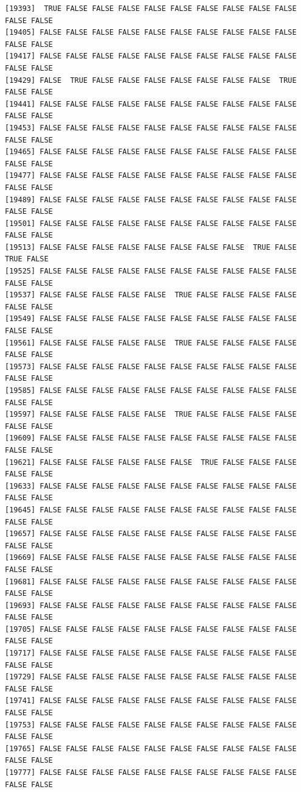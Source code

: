 \documentclass[
  a4paper,
  DIV=11,
  numbers=noendperiod]{scrartcl}
\begin{document}
\begin{verbatim}
[19393]  TRUE FALSE FALSE FALSE FALSE FALSE FALSE FALSE FALSE FALSE FALSE FALSE
[19405] FALSE FALSE FALSE FALSE FALSE FALSE FALSE FALSE FALSE FALSE FALSE FALSE
[19417] FALSE FALSE FALSE FALSE FALSE FALSE FALSE FALSE FALSE FALSE FALSE FALSE
[19429] FALSE  TRUE FALSE FALSE FALSE FALSE FALSE FALSE FALSE  TRUE FALSE FALSE
[19441] FALSE FALSE FALSE FALSE FALSE FALSE FALSE FALSE FALSE FALSE FALSE FALSE
[19453] FALSE FALSE FALSE FALSE FALSE FALSE FALSE FALSE FALSE FALSE FALSE FALSE
[19465] FALSE FALSE FALSE FALSE FALSE FALSE FALSE FALSE FALSE FALSE FALSE FALSE
[19477] FALSE FALSE FALSE FALSE FALSE FALSE FALSE FALSE FALSE FALSE FALSE FALSE
[19489] FALSE FALSE FALSE FALSE FALSE FALSE FALSE FALSE FALSE FALSE FALSE FALSE
[19501] FALSE FALSE FALSE FALSE FALSE FALSE FALSE FALSE FALSE FALSE FALSE FALSE
[19513] FALSE FALSE FALSE FALSE FALSE FALSE FALSE FALSE  TRUE FALSE  TRUE FALSE
[19525] FALSE FALSE FALSE FALSE FALSE FALSE FALSE FALSE FALSE FALSE FALSE FALSE
[19537] FALSE FALSE FALSE FALSE FALSE  TRUE FALSE FALSE FALSE FALSE FALSE FALSE
[19549] FALSE FALSE FALSE FALSE FALSE FALSE FALSE FALSE FALSE FALSE FALSE FALSE
[19561] FALSE FALSE FALSE FALSE FALSE  TRUE FALSE FALSE FALSE FALSE FALSE FALSE
[19573] FALSE FALSE FALSE FALSE FALSE FALSE FALSE FALSE FALSE FALSE FALSE FALSE
[19585] FALSE FALSE FALSE FALSE FALSE FALSE FALSE FALSE FALSE FALSE FALSE FALSE
[19597] FALSE FALSE FALSE FALSE FALSE  TRUE FALSE FALSE FALSE FALSE FALSE FALSE
[19609] FALSE FALSE FALSE FALSE FALSE FALSE FALSE FALSE FALSE FALSE FALSE FALSE
[19621] FALSE FALSE FALSE FALSE FALSE FALSE  TRUE FALSE FALSE FALSE FALSE FALSE
[19633] FALSE FALSE FALSE FALSE FALSE FALSE FALSE FALSE FALSE FALSE FALSE FALSE
[19645] FALSE FALSE FALSE FALSE FALSE FALSE FALSE FALSE FALSE FALSE FALSE FALSE
[19657] FALSE FALSE FALSE FALSE FALSE FALSE FALSE FALSE FALSE FALSE FALSE FALSE
[19669] FALSE FALSE FALSE FALSE FALSE FALSE FALSE FALSE FALSE FALSE FALSE FALSE
[19681] FALSE FALSE FALSE FALSE FALSE FALSE FALSE FALSE FALSE FALSE FALSE FALSE
[19693] FALSE FALSE FALSE FALSE FALSE FALSE FALSE FALSE FALSE FALSE FALSE FALSE
[19705] FALSE FALSE FALSE FALSE FALSE FALSE FALSE FALSE FALSE FALSE FALSE FALSE
[19717] FALSE FALSE FALSE FALSE FALSE FALSE FALSE FALSE FALSE FALSE FALSE FALSE
[19729] FALSE FALSE FALSE FALSE FALSE FALSE FALSE FALSE FALSE FALSE FALSE FALSE
[19741] FALSE FALSE FALSE FALSE FALSE FALSE FALSE FALSE FALSE FALSE FALSE FALSE
[19753] FALSE FALSE FALSE FALSE FALSE FALSE FALSE FALSE FALSE FALSE FALSE FALSE
[19765] FALSE FALSE FALSE FALSE FALSE FALSE FALSE FALSE FALSE FALSE FALSE FALSE
[19777] FALSE FALSE FALSE FALSE FALSE FALSE FALSE FALSE FALSE FALSE FALSE FALSE

\end{verbatim}
\end{document}
